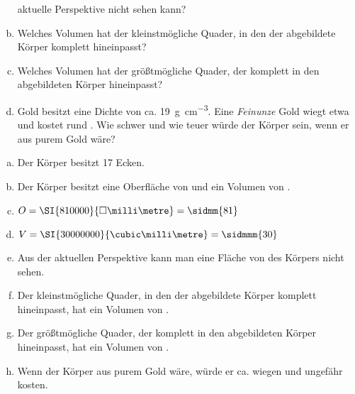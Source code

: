 \begin{exercise}
\begin{enumerate}[a)]
            aktuelle Perspektive nicht sehen kann?
      \item Welches Volumen hat der kleinstmögliche Quader, in den der
            abgebildete Körper komplett hineinpasst?
      \item Welches Volumen hat der größtmögliche Quader, der komplett in den
            abgebildeten Körper hineinpasst?
      \item Gold besitzt eine Dichte von ca. \SI[per-mode=symbol]{19}{\gram\per\cubic\centi\metre}.
            Eine \emph{Feinunze} Gold wiegt etwa  und kostet rund
            . Wie schwer und wie teuer würde der Körper sein, wenn er
            aus purem Gold wäre?
    \end{enumerate}
  \fi
  \ifoutcome\outcome\par
    \begin{enumerate}[a)]
      \item Der Körper besitzt 17 Ecken.
      \item Der Körper besitzt eine Oberfläche von
             und ein Volumen von
            .
      \item $O=\SI{810000}{\square\milli\metre}=\sidmm{81}$
      \item $V=\SI{30000000}{\cubic\milli\metre}=\sidmmm{30}$
      \item Aus der aktuellen Perspektive kann man eine Fläche von
             des Körpers nicht sehen.
      \item Der kleinstmögliche Quader, in den der abgebildete Körper
            komplett hineinpasst, hat ein Volumen von .
      \item Der größtmögliche Quader, der komplett in den abgebildeten Körper
            hineinpasst, hat ein Volumen von .
      \item Wenn der Körper aus purem Gold wäre, würde er ca. 
            wiegen und ungefähr  kosten.
    \end{enumerate}
  \fi
\end{exercise}
